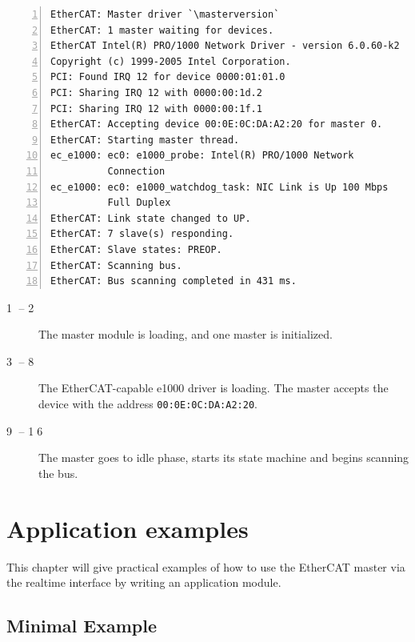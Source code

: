 \documentclass[a4paper,12pt,BCOR6mm,bibtotoc,idxtotoc]{scrbook}
\newcommand{\masterversion}{1.4.0}
\newcommand{\linenum}[1]{\normalfont\textcircled{\tiny #1}}
\begin{document}
\begin{lstlisting}[numbers=left]
EtherCAT: Master driver `\masterversion`
EtherCAT: 1 master waiting for devices.
EtherCAT Intel(R) PRO/1000 Network Driver - version 6.0.60-k2
Copyright (c) 1999-2005 Intel Corporation.
PCI: Found IRQ 12 for device 0000:01:01.0
PCI: Sharing IRQ 12 with 0000:00:1d.2
PCI: Sharing IRQ 12 with 0000:00:1f.1
EtherCAT: Accepting device 00:0E:0C:DA:A2:20 for master 0.
EtherCAT: Starting master thread.
ec_e1000: ec0: e1000_probe: Intel(R) PRO/1000 Network
          Connection
ec_e1000: ec0: e1000_watchdog_task: NIC Link is Up 100 Mbps
          Full Duplex
EtherCAT: Link state changed to UP.
EtherCAT: 7 slave(s) responding.
EtherCAT: Slave states: PREOP.
EtherCAT: Scanning bus.
EtherCAT: Bus scanning completed in 431 ms.
\end{lstlisting}

\begin{description}

\item[\linenum{1} -- \linenum{2}] The master module is loading, and one master
is initialized.

\item[\linenum{3} -- \linenum{8}] The EtherCAT-capable e1000 driver is
loading. The master accepts the device with the address
\lstinline+00:0E:0C:DA:A2:20+.

\item[\linenum{9} -- \linenum{16}] The master goes to idle phase, starts its
state machine and begins scanning the bus.

\end{description}


\chapter{Application examples}
\label{chapter:examples}

This chapter will give practical examples of how to use the EtherCAT master via
the realtime interface by writing an application module.


\section{Minimal Example}
\label{sec:mini}
\end{document}
